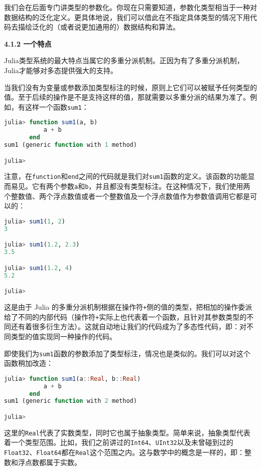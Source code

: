我们会在后面专门讲类型的参数化。你现在只需要知道，参数化类型相当于一种对数据结构的泛化定义。更具体地说，我们可以借此在不指定具体类型的情况下用代码去描绘泛化的（或者说更加通用的）数据结构和算法。

\textbf{4.1.2 一个特点}

Julia类型系统的最大特点当属它的多重分派机制。正因为有了多重分派机制，Julia才能够对多态提供强大的支持。

当我们没有为变量或参数添加类型标注的时候，原则上它们可以被赋予任何类型的值。至于后续的操作是不是支持这样的值，那就需要以多重分派的结果为准了。例如，有这样一个函数\verb|sum1|：

\begin{lstlisting}[language=julia]
julia> function sum1(a, b)
           a + b
       end
sum1 (generic function with 1 method)

julia> 
\end{lstlisting}

注意，在\verb|function|和\verb|end|之间的代码就是我们对\verb|sum1|函数的定义。该函数的功能显而易见。它有两个参数\verb|a|和\verb|b|，并且都没有类型标注。在这种情况下，我们使用两个整数值、两个浮点数值或者一个整数值及一个浮点数值作为参数值调用它都是可以的：

\begin{lstlisting}[language=julia]
julia> sum1(1, 2)
3

julia> sum1(1.2, 2.3)
3.5

julia> sum1(1.2, 4)
5.2

julia> 
\end{lstlisting}

这是由于 Julia 的多重分派机制根据在操作符\verb|+|侧的值的类型，把相加的操作委派给了不同的内部代码（操作符\verb|+|实际上也代表着一个函数，且针对其参数类型的不同还有着很多衍生方法）。这就自动地让我们的代码成为了多态性代码，即：对不同类型的值实现同一种操作的代码。

即使我们为\verb|sum1|函数的参数添加了类型标注，情况也是类似的。我们可以对这个函数稍加改造：

\begin{lstlisting}[language=julia]
julia> function sum1(a::Real, b::Real)
           a + b
       end
sum1 (generic function with 2 method)

julia> 
\end{lstlisting}

这里的\verb|Real|代表了实数类型，同时它也属于抽象类型。简单来说，抽象类型代表着一个类型范围。比如，我们之前讲过的\verb|Int64|、\verb|UInt32|以及未曾碰到过的\verb|Float32|、\verb|Float64|都在\verb|Real|这个范围之内。这与数学中的概念是一样的，即：整数和浮点数都属于实数。

